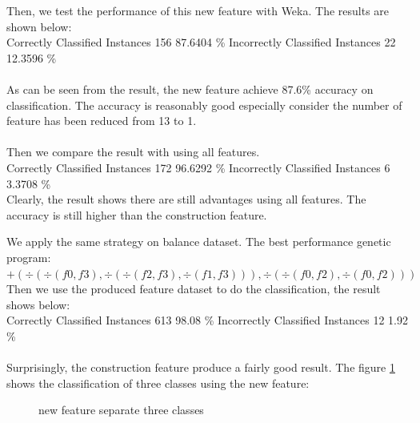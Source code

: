 \documentclass[11pt, a4paper, oneside, openright]{article}
\begin{document}
Then, we test the performance of this new feature with Weka.
The results are shown below:
\\
\newline Correctly Classified Instances   \hspace * {4mm}      156     \hspace * {4mm}           87.6404 \%
\newline Incorrectly Classified Instances   \hspace * {4mm}      22     \hspace * {4mm}           12.3596 \%
\\
\\
As can be seen from the result, the new feature achieve 87.6\% accuracy on classification. The accuracy is reasonably good especially consider the number of feature has been reduced from 13 to 1.
\\
\\
Then we compare the result with using all features.
\\
\newline Correctly Classified Instances   \hspace * {4mm}      172    \hspace * {4mm}           96.6292 \%
\newline Incorrectly Classified Instances   \hspace * {4mm}      6     \hspace * {4mm}           3.3708 \%
\\
\newline Clearly, the result shows there are still advantages using all features. The accuracy is still higher than the construction feature.

We apply the same strategy on balance dataset.
The best performance genetic program:
\newline \hspace * {2.5cm} $+(\div ( \div (f0, f3), \div( \div (f2, f3), \div (f1, f3))), \div ( \div (f0, f2), \div (f0, f2)))$
\newline Then we use the produced feature dataset to do the classification, the result shows below:
\\
\newline Correctly Classified Instances      \hspace * {4mm}   613      \hspace * {4mm}         98.08   \%
\newline Incorrectly Classified Instances  \hspace * {4mm}      12       \hspace * {4mm}         1.92   \%
\\
\\
Surprisingly, the construction feature produce a fairly good result.
The figure \ref{fig:classes_2} shows the classification of three classes using the new feature:

  \begin{figure}[!ht]
  \centerline{}
  \caption{new feature separate three classes}
  \label{fig:classes_2}
  \end{figure}
\end{document}

